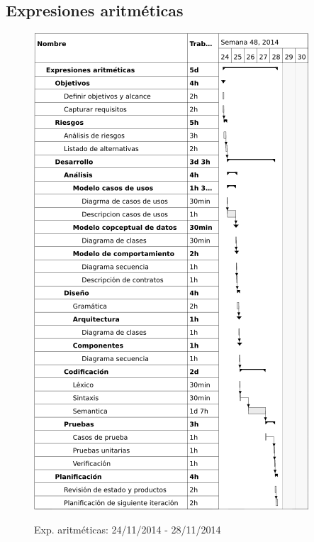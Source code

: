 \subsection{Expresiones aritméticas}
\begin{center}
\begin{figure}[H]
\centering
\includegraphics[scale=1]{planning/5-expresiones-aritmeticas.png} \\
\caption{Exp. aritméticas: 24/11/2014 - 28/11/2014 }
\end{figure}
\end{center}

